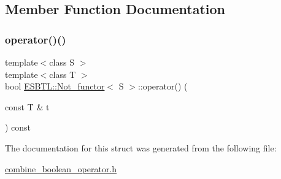 \subsection{Member Function Documentation}
\mbox{\label{structESBTL_1_1Not__functor_a207c726758b2318efe580dd948d4d7a5}} 
\subsubsection{\texorpdfstring{operator()()}{operator()()}}
{\footnotesize\ttfamily template$<$class S $>$ \\
template$<$class T $>$ \\
bool \hyperlink{structESBTL_1_1Not__functor}{E\+S\+B\+T\+L\+::\+Not\+\_\+functor}$<$ S $>$\+::operator() (\begin{DoxyParamCaption}\item[{const T \&}]{t }\end{DoxyParamCaption}) const\hspace{0.3cm}{\ttfamily [inline]}}



The documentation for this struct was generated from the following file\+:\begin{DoxyCompactItemize}
\item 
\hyperlink{combine__boolean__operator_8h}{combine\+\_\+boolean\+\_\+operator.\+h}\end{DoxyCompactItemize}
